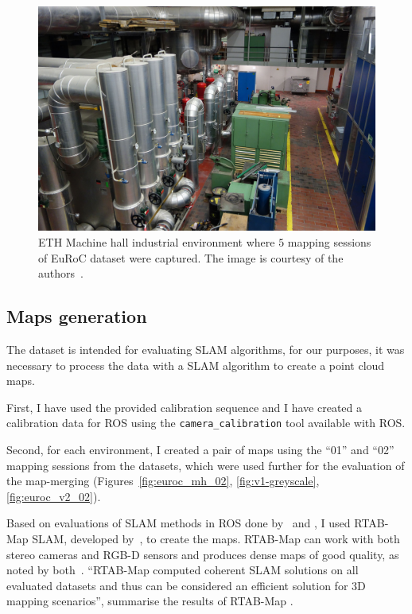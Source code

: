 \begin{figure}
    \centering
    \includegraphics[width=\textwidth]{../img/eth_machine_room.jpg}
    \caption[ETH Machine hall]{ETH Machine hall industrial environment where $5$ mapping sessions of EuRoC dataset were captured. The image is courtesy of the authors~\citep{Burri2016}.}
    \label{fig:eth-machine-hall}
\end{figure}

\subsection{Maps generation}
\label{sec:euroc-generating-maps}

The dataset is intended for evaluating \gls{SLAM} algorithms, for our purposes, it was necessary to process the data with a \gls{SLAM} algorithm to create a point cloud maps.

First, I have used the provided calibration sequence and I have created a calibration data for \gls{ROS} using the \texttt{camera\_calibration} tool available with \gls{ROS}.

Second, for each environment, I created a pair of maps using the ``01'' and ``02'' mapping sessions from the datasets, which were used further for the evaluation of the map-merging (Figures~\ref{fig:euroc_mh_02}, \ref{fig:v1-greyscale}, \ref{fig:euroc_v2_02}).

Based on evaluations of \gls{SLAM} methods in \gls{ROS} done by~\citet{silva2017experimental} and \citet{ibragimov2017comparison}, I used RTAB-Map \gls{SLAM}, developed by~\citet{labbe2014online}, to create the maps. RTAB-Map can work with both stereo cameras and \gls{RGB-D} sensors and produces dense maps of good quality, as noted by both~\citet{silva2017experimental,ibragimov2017comparison}. ``RTAB-Map computed coherent SLAM solutions on all evaluated datasets and thus can be considered an efficient solution for 3D mapping scenarios'', summarise the results of RTAB-Map \citet{silva2017experimental}.

